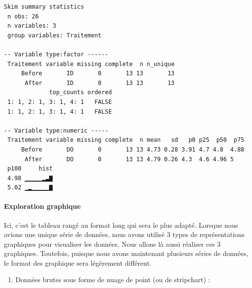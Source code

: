 \documentclass[a4paperpaper,]{article}
\newenvironment{Shaded}{\begin{snugshade}}{\end{snugshade}}
\newcommand{\DataTypeTok}[1]{\textcolor[rgb]{0.00,0.34,0.68}{#1}}
\newcommand{\KeywordTok}[1]{\textcolor[rgb]{0.12,0.11,0.11}{\textbf{#1}}}
\newcommand{\NormalTok}[1]{\textcolor[rgb]{0.12,0.11,0.11}{#1}}
\newcommand{\OperatorTok}[1]{\textcolor[rgb]{0.12,0.11,0.11}{#1}}
\newcommand{\StringTok}[1]{\textcolor[rgb]{0.75,0.01,0.01}{#1}}
\providecommand{\tightlist}{%
  \setlength{\itemsep}{0pt}\setlength{\parskip}{0pt}}
\let\oldparagraph\paragraph
\renewcommand{\paragraph}[1]{\oldparagraph{#1}\mbox{}}
\begin{document}
\begin{Shaded}
\end{Shaded}

\begin{verbatim}
Skim summary statistics
 n obs: 26 
 n variables: 3 
 group variables: Traitement 

-- Variable type:factor ------
 Traitement variable missing complete  n n_unique
     Before       ID       0       13 13       13
      After       ID       0       13 13       13
             top_counts ordered
 1: 1, 2: 1, 3: 1, 4: 1   FALSE
 1: 1, 2: 1, 3: 1, 4: 1   FALSE

-- Variable type:numeric -----
 Traitement variable missing complete  n mean   sd   p0 p25  p50  p75
     Before       DO       0       13 13 4.73 0.28 3.91 4.7 4.8  4.88
      After       DO       0       13 13 4.79 0.26 4.3  4.6 4.96 5   
 p100     hist
 4.98 ▁▁▁▁▁▂▃▇
 5.02 ▁▂▁▁▁▁▁▇
\end{verbatim}

\hypertarget{exploration-graphique-1}{%
\paragraph{Exploration graphique}\label{exploration-graphique-1}}

Ici, c'est le tableau rangé au format long qui sera le plus adapté. Lorsque nous avions une unique série de données, nous avons utilisé 3 types de représentations graphiques pour visualiser les données. Nous allons là aussi réaliser ces 3 graphiques. Toutefois, puisque nous avons maintenant plusieurs séries de données, le format des graphique sera légèrement différent.

\begin{enumerate}
\def\labelenumi{\arabic{enumi}.}
\tightlist
\item
  Données brutes sous forme de nuage de point (ou de stripchart) :
\end{enumerate}

\begin{Shaded}
\end{Shaded}
\end{document}
